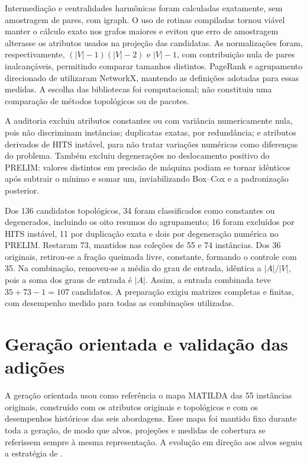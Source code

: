 Intermediação e centralidades harmônicas foram calculadas exatamente,
sem amostragem de pares, com igraph. O uso de rotinas compiladas tornou
viável manter o cálculo exato nos grafos maiores e evitou que erro de
amostragem alterasse os atributos usados na projeção das candidatas.
As normalizações foram, respectivamente, $(|V|-1)(|V|-2)$ e $|V|-1$,
com contribuição nula de pares inalcançáveis, permitindo comparar tamanhos
distintos. PageRank e agrupamento direcionado de 
utilizaram NetworkX, mantendo as definições adotadas para essas medidas.
A escolha das bibliotecas foi computacional; não constituiu uma comparação
de métodos topológicos ou de pacotes.

A auditoria excluiu atributos constantes ou com variância numericamente
nula, pois não discriminam instâncias; duplicatas exatas, por redundância;
e atributos derivados de HITS instável, para não tratar variações numéricas
como diferenças do problema. Também excluiu degenerações no deslocamento
positivo do PRELIM: valores distintos em precisão de máquina podiam se
tornar idênticos após subtrair o mínimo e somar um, inviabilizando Box--Cox
e a padronização posterior.

Dos 136 candidatos topológicos, 34 foram classificados como constantes
ou degenerados, incluindo os oito resumos do agrupamento; 16 foram
excluídos por HITS instável, 11 por duplicação exata e dois por degeneração
numérica no PRELIM. Restaram 73, mantidos nas coleções de 55 e 74 instâncias.
Dos 36 originais, retirou-se a fração queimada livre, constante, formando
o controle com 35. Na combinação, removeu-se a média do grau de entrada,
idêntica a $|A|/|V|$, pois a soma dos graus de entrada é $|A|$.
Assim, a entrada combinada teve $35+73-1=107$ candidatos. A preparação
exigiu matrizes completas e finitas, com desempenho medido para todas
as combinações utilizadas.

\section{Geração orientada e validação das adições}\label{sec:met-geracao}

A geração orientada usou como referência o mapa MATILDA das 55 instâncias
originais, construído com os atributos originais e topológicos e com os
desempenhos históricos das seis abordagens. Esse mapa foi mantido fixo durante
toda a geração, de modo que alvos, projeções e medidas de cobertura se
referissem sempre à mesma representação. A evolução em direção aos alvos
seguiu a estratégia de .

